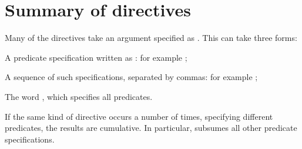 \chapter*{Summary of directives\label{directives}}%

Many of the directives take an argument specified as .  This can
take three forms:
\begin{LightEnumerate}
\item
  A predicate specification written as : for example
  ;
\item
  A sequence of such specifications, separated by commas: for example
  ;
\item
  The word , which specifies all predicates.
\end{LightEnumerate}
If the same kind of directive occurs a number of times, specifying different
predicates, the results are cumulative.  In particular,  subsumes all
other predicate specifications.

